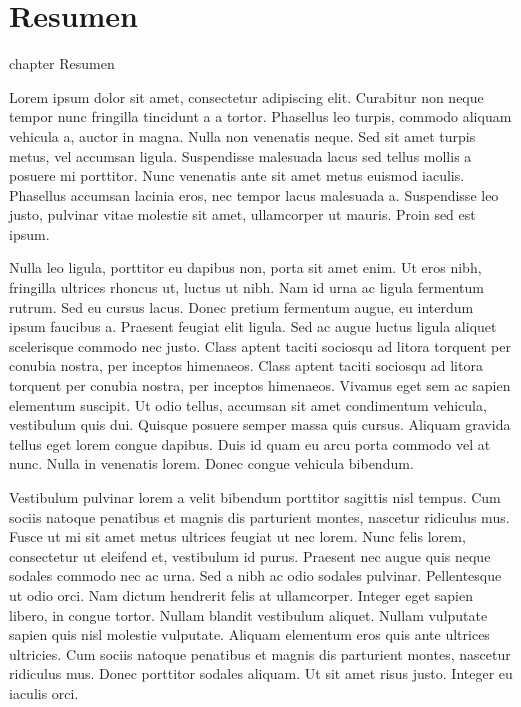 \chapter*{Resumen}
 {chapter} {Resumen}%



Lorem ipsum dolor sit amet, consectetur adipiscing elit. Curabitur non
neque tempor nunc fringilla tincidunt a a tortor. Phasellus leo
turpis, commodo aliquam vehicula a, auctor in magna. Nulla non
venenatis neque. Sed sit amet turpis metus, vel accumsan
ligula. Suspendisse malesuada lacus sed tellus mollis a posuere mi
porttitor. Nunc venenatis ante sit amet metus euismod
iaculis. Phasellus accumsan lacinia eros, nec tempor lacus malesuada
a. Suspendisse leo justo, pulvinar vitae molestie sit amet,
ullamcorper ut mauris. Proin sed est ipsum.

Nulla leo ligula, porttitor eu dapibus non, porta sit amet enim. Ut
eros nibh, fringilla ultrices rhoncus ut, luctus ut nibh. Nam id urna
ac ligula fermentum rutrum. Sed eu cursus lacus. Donec pretium
fermentum augue, eu interdum ipsum faucibus a. Praesent feugiat elit
ligula. Sed ac augue luctus ligula aliquet scelerisque commodo nec
justo. Class aptent taciti sociosqu ad litora torquent per conubia
nostra, per inceptos himenaeos. Class aptent taciti sociosqu ad litora
torquent per conubia nostra, per inceptos himenaeos. Vivamus eget sem
ac sapien elementum suscipit. Ut odio tellus, accumsan sit amet
condimentum vehicula, vestibulum quis dui. Quisque posuere semper
massa quis cursus. Aliquam gravida tellus eget lorem congue
dapibus. Duis id quam eu arcu porta commodo vel at nunc. Nulla in
venenatis lorem. Donec congue vehicula bibendum.

Vestibulum pulvinar lorem a velit bibendum porttitor sagittis nisl
tempus. Cum sociis natoque penatibus et magnis dis parturient montes,
nascetur ridiculus mus. Fusce ut mi sit amet metus ultrices feugiat ut
nec lorem. Nunc felis lorem, consectetur ut eleifend et, vestibulum id
purus. Praesent nec augue quis neque sodales commodo nec ac urna. Sed
a nibh ac odio sodales pulvinar. Pellentesque ut odio orci. Nam dictum
hendrerit felis at ullamcorper. Integer eget sapien libero, in congue
tortor. Nullam blandit vestibulum aliquet. Nullam vulputate sapien
quis nisl molestie vulputate. Aliquam elementum eros quis ante
ultrices ultricies. Cum sociis natoque penatibus et magnis dis
parturient montes, nascetur ridiculus mus. Donec porttitor sodales
aliquam. Ut sit amet risus justo. Integer eu iaculis orci.

